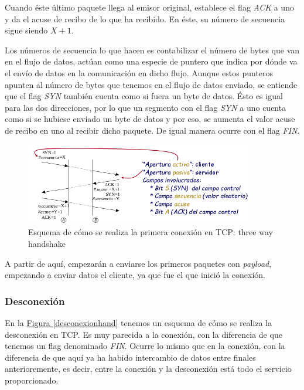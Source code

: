 \documentclass[10pt,a4paper,spanish]{report}
\begin{document}
Cuando éste último paquete llega al emisor original, establece el flag \textcolor{tema3}{\textit{ACK}} a uno y da el acuse de recibo de lo que ha recibido. En éste, su número de secuencia sigue siendo $X+1$.

Los números de secuencia lo que hacen es contabilizar el número de bytes que van en el flujo de datos, actúan como una especie de puntero que indica por dónde va el envío de datos en la comunicación en dicho flujo. Aunque estos punteros apunten al número de bytes que tenemos en el flujo de datos enviado, se entiende que el flag \textcolor{tema3}{\textit{SYN}} también cuenta como si fuera un byte de datos. Ésto es igual para las dos direcciones, por lo que un segmento con el flag \textcolor{tema3}{\textit{SYN}} a uno cuenta como si se hubiese enviado un byte de datos y por eso, se aumenta el valor acuse de recibo en uno al recibir dicho paquete. De igual manera ocurre con el flag \textcolor{tema3}{\textit{FIN}}.

\begin{figure}[!h]
  \centering
  \includegraphics[width=0.9\textwidth]{3wayhandshake}
  \caption{Esquema de cómo se realiza la primera conexión en TCP: three way handshake}
  \label{handshake}
\end{figure}

A partir de aquí, empezarán a enviarse los primeros paquetes con \textit{\textcolor{tema3}{payload}}, empezando a enviar datos el cliente, ya que fue el que inició la conexión.

\subsubsection{\textcolor{tema3}Desconexión}
En la \hyperref[desconexionhand]{Figura \ref*{desconexionhand}} tenemos un esquema de cómo se realiza la desconexión en TCP. Es muy parecida a la conexión, con la diferencia de que tenemos un flag denominado \textit{\textcolor{tema3}{FIN}}. Ocurre lo mismo que en la conexión, con la diferencia de que aquí ya ha habido intercambio de datos entre finales anterioremente, es decir, entre la conexión y la desconexión está todo el servicio proporcionado. 
\end{document}
